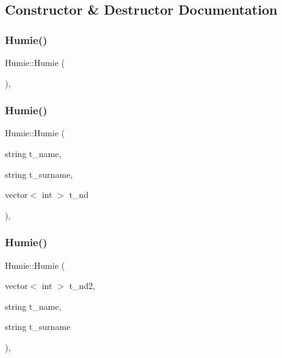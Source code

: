 \subsection{Constructor \& Destructor Documentation}
\mbox{\label{class_humie_a9a042aaece31359fe6fed36471e6c45a}} 
\subsubsection{\texorpdfstring{Humie()}{Humie()}\hspace{0.1cm}{\footnotesize\ttfamily [1/6]}}
{\footnotesize\ttfamily Humie\+::\+Humie (\begin{DoxyParamCaption}{ }\end{DoxyParamCaption})\hspace{0.3cm}{\ttfamily [inline]}, {\ttfamily [protected]}}

\mbox{\label{class_humie_aaf022723e87d5b942b75ac0f3886040f}} 
\subsubsection{\texorpdfstring{Humie()}{Humie()}\hspace{0.1cm}{\footnotesize\ttfamily [2/6]}}
{\footnotesize\ttfamily Humie\+::\+Humie (\begin{DoxyParamCaption}\item[{string}]{t\+\_\+name,  }\item[{string}]{t\+\_\+surname,  }\item[{vector$<$ int $>$}]{t\+\_\+nd }\end{DoxyParamCaption})\hspace{0.3cm}{\ttfamily [inline]}, {\ttfamily [protected]}}

\mbox{\label{class_humie_a81c0810d76013148334772fbcaceaf93}} 
\subsubsection{\texorpdfstring{Humie()}{Humie()}\hspace{0.1cm}{\footnotesize\ttfamily [3/6]}}
{\footnotesize\ttfamily Humie\+::\+Humie (\begin{DoxyParamCaption}\item[{vector$<$ int $>$}]{t\+\_\+nd2,  }\item[{string}]{t\+\_\+name,  }\item[{string}]{t\+\_\+surname }\end{DoxyParamCaption})\hspace{0.3cm}{\ttfamily [inline]}, {\ttfamily [protected]}}


